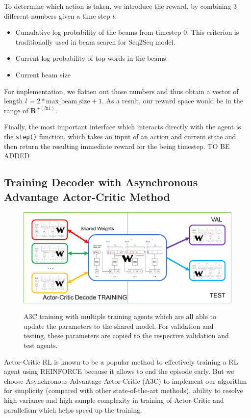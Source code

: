 \documentclass[11pt,a4paper]{article}
\begin{document}
To determine which action is taken, we introduce the reward, by combining 3 different numbers given a time step $t$: 
\begin{itemize}
	\item Cumulative log probability of the beams from timestep $0$. This criterion is traditionally used in beam search for Seq2Seq model. 
    \item Current log probability of top words in the beams. 
    \item Current beam size 
\end{itemize}

For implementation, we flatten out those numbers and thus obtain a vector of length \textit{l = $2 * \text{max\_beam\_size} + 1$}. As a result, our reward space would be in the range of $\mathbf{R}^{+(l \text{x} 1)}$.

Finally, the most important interface which interacts directly with the agent is the \texttt{step()} function, which takes an input of an action and current state and then return the resulting immediate reward for the being timestep. 
TO BE ADDED 

\subsection{Training Decoder with Asynchronous Advantage Actor-Critic Method}


\begin{figure}[ht]
\centering
\includegraphics[width=1.0\linewidth]{a3c.png}
\caption{A3C training with multiple training agents which are all able to update the parameters to the shared model. For validation and testing, these parameters are copied to the respective validation and test agents.}
\label{fig:a3c}
\end{figure}

Actor-Critic RL \cite{sutton1998reinforcement} is known to be a popular method to effectively training a RL agent using REINFORCE \cite{williams1992simple} because it allows to end the episode early. But we choose Asynchronous Advantage Actor-Critic (A3C) \cite{mnih2016asynchronous} to implement our algorithm for simplicity (compared with other state-of-the-art methods), ability to resolve high variance and high sample complexity in training of Actor-Critic and parallelism which helps speed up the training. 
\end{document}

